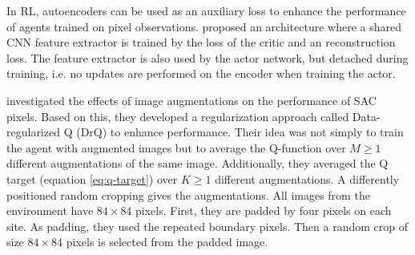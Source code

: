 In RL, autoencoders can be used as an auxiliary loss to enhance the performance of agents trained on pixel observations. \citeauthor{yaratsImprovingSampleEfficiency2020} \cite{yaratsImprovingSampleEfficiency2020} proposed an architecture where a shared CNN feature extractor is trained by the loss of the critic and an reconstruction loss. The feature extractor is also used by the actor network, but detached during training, i.e. no updates are performed on the encoder when training the actor.

\citeauthor{kostrikovImageAugmentationAll2021} \cite{kostrikovImageAugmentationAll2021} investigated the effects of image augmentations on the performance of SAC pixels. Based on this, they developed a regularization approach called Data-regularized Q (DrQ) to enhance performance. Their idea was not simply to train the agent with augmented images but to average the Q-function over $M \geq 1$ different augmentations of the same image. Additionally, they averaged the Q target (equation \ref{eq:q-target}) over $K \geq 1$ different augmentations. A differently positioned random cropping gives the augmentations. All images from the environment have $84\times84$ pixels. First, they are padded by four pixels on each site. As padding, they used the repeated boundary pixels. Then a random crop of size $84\times84$ pixels is selected from the padded image.